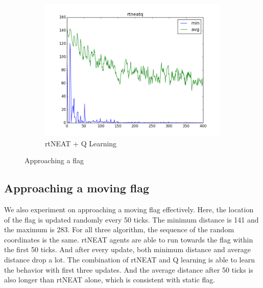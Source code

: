 \documentclass[letterpaper]{article}
\begin{document}
\begin{figure}[ht]
\begin{subfigure}{0.7\columnwidth}
  \includegraphics[width=\columnwidth]{flag_rtneatq.png}
  \caption{rtNEAT + Q Learning}
  \label{fig:flag_neatq}
\end{subfigure}
\caption{Approaching a flag}
\label{fig:flag}
\end{figure}

\subsection{Approaching a moving flag}
We also experiment on approaching a moving flag effectively. Here, the location of the flag is updated randomly every 50 ticks. The minimum distance is 141 and the maximum is 283. For all three algorithm, the sequence of the random coordinates is the same. rtNEAT agents are able to run towards the flag within the first 50 ticks. And after every update, both minimum distance and average distance drop a lot. The combination of rtNEAT and Q learning is able to learn the behavior with first three updates. And the average distance after 50 ticks is also longer than rtNEAT alone, which is consistent with static flag. 
\end{document}
